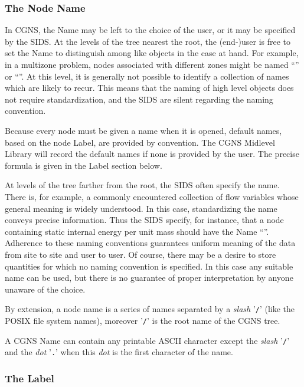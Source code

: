\subsubsection{The Node Name}
\label{s:nodename}

In CGNS, the Name may be left to the choice of the user, or it may be
specified by the SIDS. At the levels of the tree nearest the root,
the (end-)user is free to set the Name to distinguish among like
objects in the case at hand. For example, in a multizone problem, nodes
associated with different zones might be named ``''
or ``''. At this level, it is generally
not possible to identify a collection of names which are likely to
recur. This means that the naming of high level objects does not
require standardization, and the SIDS are silent regarding the naming
convention.

Because every \HDF node must be given a name when it is opened, default
names, based on the node Label, are provided by convention. The CGNS
Midlevel Library will record the default names if none is provided by
the user. The precise formula is given in the Label section below.

At levels of the tree farther from the root, the SIDS often specify
the name. There is, for example, a commonly encountered collection of
flow variables whose general meaning is widely understood. In this
case, standardizing the name conveys precise information. Thus the SIDS
specify, for instance, that a node containing static internal energy
per unit mass should have the Name ``''. Adherence
to these naming conventions guarantees uniform meaning of the data from
site to site and user to user. Of course, there may be a desire to
store quantities for which no naming convention is specified. In this
case any suitable name can be used, but there is no guarantee of proper
interpretation by anyone unaware of the choice.

By extension, a node name is a series of names separated by a
\emph{slash} '\texttt{/}' (like the POSIX file system names),
moreover '\texttt{/}' is the root name of the CGNS tree.

A CGNS Name can contain any printable ASCII character except the 
\emph{slash} '\texttt{/}' and the \emph{dot} '\texttt{.}' when
this \emph{dot} is the first character of the name.

\subsubsection{The Label}

